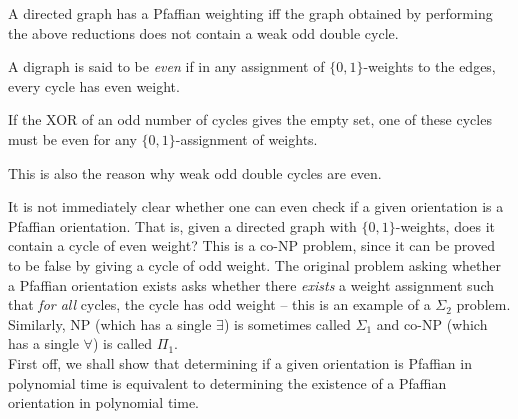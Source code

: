 \begin{ftheo}
	A directed graph has a Pfaffian weighting iff the graph obtained by performing the above reductions does not contain a weak odd double cycle.
\end{ftheo}



\begin{definition}
	A digraph is said to be \emph{even} if in any assignment of $\{0,1\}$-weights to the edges, every cycle has even weight.
\end{definition}

\begin{fprop}
	\label{prop:1}
	If the XOR of an odd number of cycles gives the empty set, one of these cycles must be even for any $\{0,1\}$-assignment of weights.
\end{fprop}
This is also the reason why weak odd double cycles are even.

It is not immediately clear whether one can even check if a given orientation is a Pfaffian orientation. That is, given a directed graph with $\{0,1\}$-weights, does it contain a cycle of even weight? This is a co-\textsf{NP} problem, since it can be proved to be false by giving a cycle of odd weight. The original problem asking whether a Pfaffian orientation exists asks whether there \emph{exists} a weight assignment such that \emph{for all} cycles, the cycle has odd weight -- this is an example of a $\Sigma_2$ problem. Similarly, \textsf{NP} (which has a single $\exists$) is sometimes called $\Sigma_1$ and co-\textsf{NP} (which has a single $\forall$) is called $\Pi_1$.\\

First off, we shall show that determining if a given orientation is Pfaffian in polynomial time is equivalent to determining the existence of a Pfaffian orientation in polynomial time. 


